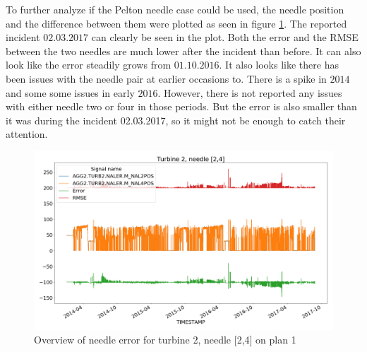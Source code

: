         To further analyze if the Pelton needle case could be used, the needle position and the difference between them were plotted as seen in figure \ref{fig:plant1_needle_error}. The reported incident $02.03.2017$ can clearly be seen in the plot. Both the error and the RMSE between the two needles are much lower after the incident than before. It can also look like the error steadily grows from $01.10.2016$. It also looks like there has been issues with the needle pair at earlier occasions to. There is a spike in $2014$ and some some issues in early $2016$. However, there is not reported any issues with either needle two or four in those periods. But the error is also smaller than it was during the incident 02.03.2017, so it might not be enough to catch their attention. 
        
        \begin{figure}
            \centering
            \includegraphics[width=\textwidth]{report/figures/data/turbine2_needle2_4.png}
            \caption{Overview of needle error for turbine 2, needle [2,4] on plan 1}
            \label{fig:plant1_needle_error}
        \end{figure}
        
        
